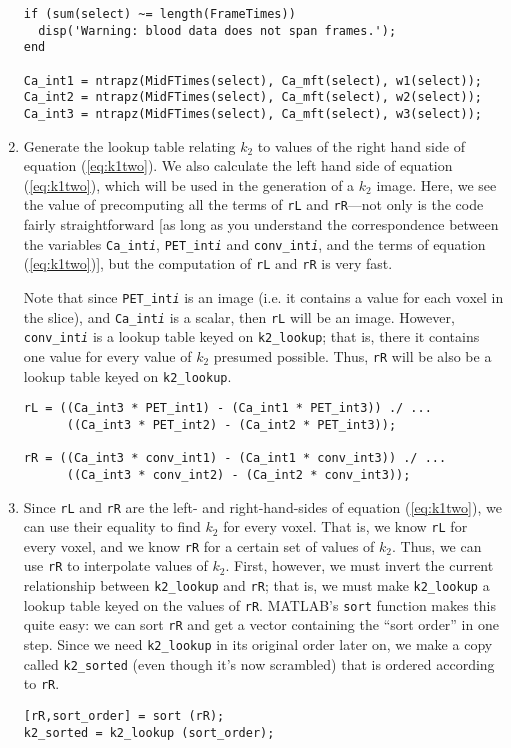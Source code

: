\documentclass[12pt]{article}
\def\code#1{{\tt #1}}
\begin{document}
\begin{enumerate}
\begin{verbatim}
if (sum(select) ~= length(FrameTimes))
  disp('Warning: blood data does not span frames.');
end
  
Ca_int1 = ntrapz(MidFTimes(select), Ca_mft(select), w1(select));
Ca_int2 = ntrapz(MidFTimes(select), Ca_mft(select), w2(select));
Ca_int3 = ntrapz(MidFTimes(select), Ca_mft(select), w3(select));
\end{verbatim}

\item Generate the lookup table relating $k_2$ to values of the right
hand side of equation (\ref{eq:k1two}).  We also calculate the left
hand side of equation (\ref{eq:k1two}), which will be used in the
generation of a $k_2$ image.  Here, we see the value of precomputing
all the terms of \code{rL} and \code{rR}---not only is the code fairly
straightforward [as long as you understand the correspondence between
the variables \code{Ca\_int{\it i\/}}, \code{PET\_int{\it i\/}} and
\code{conv\_int{\it i\/}}, and the terms of equation (\ref{eq:k1two})],
but the computation of \code{rL} and \code{rR} is very fast.

Note that since \code{PET\_int{\it i\/}} is an image (i.e. it contains
a value for each voxel in the slice), and \code{Ca\_int{\it i\/}} is a
scalar, then \code{rL} will be an image.  However, 
\code{conv\_int{\it i\/}} is a lookup table keyed on
\code{k2\_lookup}; that is, there it contains one value for every
value of $k_2$ presumed possible.  Thus, \code{rR} will be also be a
lookup table keyed on \code{k2\_lookup}.
\begin{verbatim}
rL = ((Ca_int3 * PET_int1) - (Ca_int1 * PET_int3)) ./ ...
      ((Ca_int3 * PET_int2) - (Ca_int2 * PET_int3));

rR = ((Ca_int3 * conv_int1) - (Ca_int1 * conv_int3)) ./ ...
      ((Ca_int3 * conv_int2) - (Ca_int2 * conv_int3));
\end{verbatim}

\item Since \code{rL} and \code{rR} are the left- and right-hand-sides
  of equation (\ref{eq:k1two}), we can use their equality to find
  $k_2$ for every voxel.  That is, we know \code{rL} for every voxel,
  and we know \code{rR} for a certain set of values of $k_2$.  Thus,
  we can use \code{rR} to interpolate values of $k_2$.  First,
  however, we must invert the current relationship between
  \code{k2\_lookup} and \code{rR}; that is, we must make
  \code{k2\_lookup} a lookup table keyed on the values of \code{rR}.
  MATLAB's \code{sort} function makes this quite easy: we can sort
  \code{rR} and get a vector containing the ``sort order'' in one
  step.  Since we need \code{k2\_lookup} in its original order later
  on, we make a copy called \code{k2\_sorted} (even though it's now
  scrambled) that is ordered according to \code{rR}.
\begin{verbatim}
[rR,sort_order] = sort (rR);
k2_sorted = k2_lookup (sort_order);
\end{verbatim}


\end{enumerate}
\end{document}

